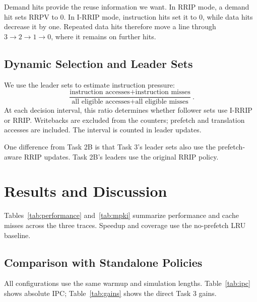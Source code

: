 \documentclass[11pt,a4paper]{article}
\begin{document}
Demand hits provide the reuse information we want. In RRIP mode, a demand
hit sets RRPV to 0. In I-RRIP mode, instruction hits set it to 0, while
data hits decrease it by one. Repeated data hits therefore move a line
through $3\rightarrow2\rightarrow1\rightarrow0$, where it remains on
further hits.

\subsection{Dynamic Selection and Leader Sets}
We use the leader sets to estimate instruction pressure:
\[
\frac{\text{instruction accesses}+\text{instruction misses}}
{\text{all eligible accesses}+\text{all eligible misses}}.
\]
At each decision interval, this ratio determines whether follower sets
use I-RRIP or RRIP. Writebacks are excluded from the counters; prefetch
and translation accesses are included. The interval is counted in leader
updates.

One difference from Task 2B is that Task 3's leader sets also use the
prefetch-aware RRIP updates. Task 2B's leaders use the original RRIP policy.

\section{Results and Discussion}

Tables~\ref{tab:performance} and~\ref{tab:mpki} summarize performance and
cache misses across the three traces. Speedup and coverage use the
no-prefetch LRU baseline.

\begin{table}[H]
\centering\small
\caption{Task 3 performance. Speedup and coverage use no-prefetch LRU.}
\label{tab:performance}

\end{table}

\begin{table}[H]
\centering\small
\caption{Task 3 load misses per 1000 measured instructions.}
\label{tab:mpki}

\end{table}

\subsection{Comparison with Standalone Policies}
All configurations use the same warmup and simulation lengths. Table~\ref{tab:ipc} shows
absolute IPC; Table~\ref{tab:gains} shows the direct Task 3 gains.
\end{document}
